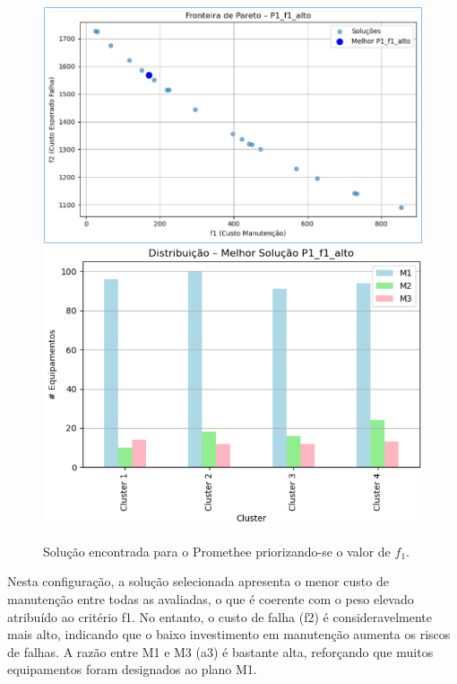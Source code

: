 \documentclass[conference]{IEEEtran}
\begin{document}
\begin{figure}[htbp]
    \centering
    \includegraphics[width=\columnwidth,trim=1 1 1 1,clip]{../images/fronteira-promethee-f1.png}
    \includegraphics[width=\columnwidth,trim=1 1 1 1,clip]{../images/result-promethee-f1.png}
    \caption{\label{fig:result-promethee-f1}
	Solução encontrada para o Promethee 
priorizando-se o valor de $f_1$.}
\end{figure}

Nesta configuração, a solução selecionada apresenta o menor custo de manutenção entre todas as avaliadas, o que é coerente com o peso elevado atribuído ao critério f1. No entanto, o custo de falha (f2) é consideravelmente mais alto, indicando que o baixo investimento em manutenção aumenta os riscos de falhas. A razão entre M1 e M3 (a3) é bastante alta, reforçando que muitos equipamentos foram designados ao plano M1.
\end{document}
